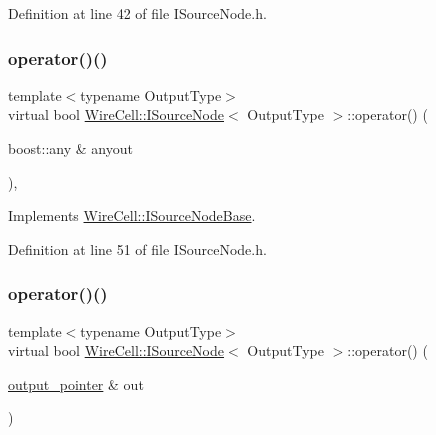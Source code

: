 Definition at line 42 of file I\+Source\+Node.\+h.

\mbox{\label{class_wire_cell_1_1_i_source_node_a4d3f01222148f2787b6097cf8c8e1905}} 
\subsubsection{\texorpdfstring{operator()()}{operator()()}\hspace{0.1cm}{\footnotesize\ttfamily [1/2]}}
{\footnotesize\ttfamily template$<$typename Output\+Type$>$ \\
virtual bool \hyperlink{class_wire_cell_1_1_i_source_node}{Wire\+Cell\+::\+I\+Source\+Node}$<$ Output\+Type $>$\+::operator() (\begin{DoxyParamCaption}\item[{boost\+::any \&}]{anyout }\end{DoxyParamCaption})\hspace{0.3cm}{\ttfamily [inline]}, {\ttfamily [virtual]}}



Implements \hyperlink{class_wire_cell_1_1_i_source_node_base_a6d29d551ab4e4b8479a062dfaa38f42f}{Wire\+Cell\+::\+I\+Source\+Node\+Base}.



Definition at line 51 of file I\+Source\+Node.\+h.

\mbox{\label{class_wire_cell_1_1_i_source_node_a945b2cc60a731bee93a7c2a1dfa0d7c3}} 
\subsubsection{\texorpdfstring{operator()()}{operator()()}\hspace{0.1cm}{\footnotesize\ttfamily [2/2]}}
{\footnotesize\ttfamily template$<$typename Output\+Type$>$ \\
virtual bool \hyperlink{class_wire_cell_1_1_i_source_node}{Wire\+Cell\+::\+I\+Source\+Node}$<$ Output\+Type $>$\+::operator() (\begin{DoxyParamCaption}\item[{\hyperlink{class_wire_cell_1_1_i_source_node_ae2743237513016d7f69d68aac1104951}{output\+\_\+pointer} \&}]{out }\end{DoxyParamCaption})\hspace{0.3cm}{\ttfamily [pure virtual]}}



